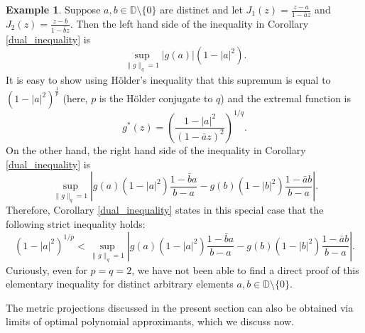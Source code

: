 \documentclass{article}
\theoremstyle{plain}
\numberwithin{Theorem}{section}
\numberwithin{equation}{section}
\theoremstyle{plain}
\newtheorem{Corollary}[Theorem]{Corollary}
\theoremstyle{definition}
\newtheorem{Example}[Theorem]{Example}
\renewcommand{\geq}{\geqslant}
\newcommand{\D}{\mathbb{D}}
\begin{document}
\begin{Example}
Suppose $a, b \in \D \setminus \{0\}$ are distinct and let $J_1(z) = \frac{z-a}{1-\bar{a}z}$ and $J_2(z)=\frac{z-b}{1-\bar{b}z}$. Then the left hand side of the inequality in Corollary \ref{dual_inequality} is
\begin{equation*}
 \sup_{\|g\|_q =1} |g(a)| (1 - |a|^2).
\end{equation*}
It is easy to show using H\"{o}lder's inequality that this supremum is equal to 
$(1 - |a|^2)^{\frac{1}{p}}$ (here, $p$ is the H\"{o}lder conjugate to $q$) and the extremal function is 
\[
g^*(z) = \left( \frac{1 - |a|^2}{(1 - \bar{a}z)^2}\right)^{1/q}.
\]
On the other hand, the right hand side of the inequality in Corollary \ref{dual_inequality} is
\begin{equation*}
 \sup_{\|g\|_q =1}
\left| g(a)(1-|a|^2) \frac{1 - \bar{b}a}{b-a} - g(b)(1-|b|^2)\frac{1 - \bar{a}b}{b-a} \right|.
\end{equation*}
Therefore, Corollary \ref{dual_inequality} states in this special case that the following strict inequality holds:
\begin{equation*}
(1 - |a|^2)^{1/p} < \sup_{\|g\|_q =1}
\left| g(a)(1-|a|^2) \frac{1 - \bar{b}a}{b-a} - g(b)(1-|b|^2)\frac{1 - \bar{a}b}{b-a} \right|.
\end{equation*}
Curiously, even for $p = q = 2$, we have not been able to find a direct proof of this elementary inequality for distinct arbitrary elements $a, b\in \D\setminus\{0\}$.
\end{Example}

The metric projections discussed in the present section can also be obtained via limits of optimal polynomial approximants, which we discuss now. 

\end{document}
